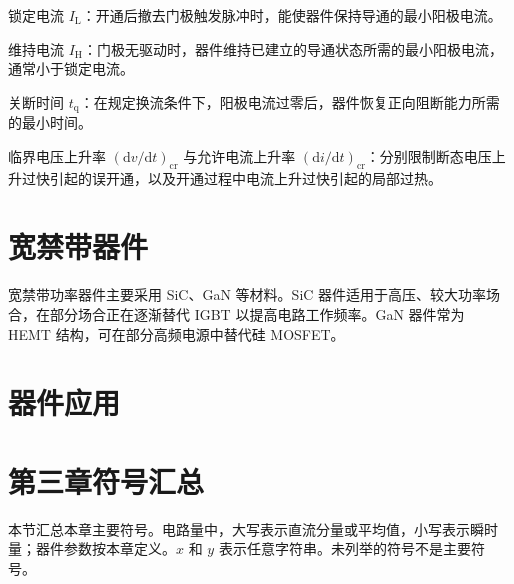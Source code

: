 锁定电流 $I_{\mathrm L}$：开通后撤去门极触发脉冲时，能使器件保持导通的最小阳极电流。

维持电流 $I_{\mathrm H}$：门极无驱动时，器件维持已建立的导通状态所需的最小阳极电流，通常小于锁定电流。

关断时间 $t_{\mathrm q}$：在规定换流条件下，阳极电流过零后，器件恢复正向阻断能力所需的最小时间。

临界电压上升率 $(\mathrm{d}v/\mathrm{d}t)_{\mathrm{cr}}$ 与允许电流上升率 $(\mathrm{d}i/\mathrm{d}t)_{\mathrm{cr}}$：分别限制断态电压上升过快引起的误开通，以及开通过程中电流上升过快引起的局部过热。

\newpage{}

\section{宽禁带器件}

宽禁带功率器件主要采用 SiC、GaN 等材料。SiC 器件适用于高压、较大功率场合，在部分场合正在逐渐替代 IGBT 以提高电路工作频率。GaN 器件常为 HEMT 结构，可在部分高频电源中替代硅 MOSFET。

\section{器件应用}



\clearpage

\section{第三章符号汇总}

本节汇总本章主要符号。电路量中，大写表示直流分量或平均值，小写表示瞬时量；器件参数按本章定义。$x$ 和 $y$ 表示任意字符串。未列举的符号不是主要符号。


\clearpage


